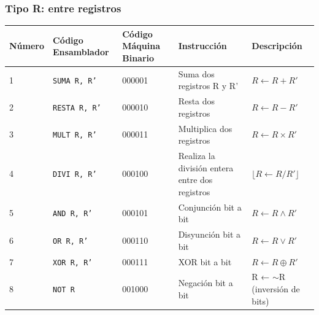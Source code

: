 \documentclass{article}
\begin{document}
\subsubsection{Tipo R: \textbf{entre registros}}

\begin{longtable}{|p{}|p{}|p{}|p{}|p{}|}
  \hline
  \textbf{Número} & \textbf{Código Ensamblador} & \textbf{Código Máquina Binario} & \textbf{Instrucción}                                               & \textbf{Descripción}                       \\
  \hline
  1               & \texttt{SUMA R, R'}         & 000001                          & Suma dos registros R y R'                                          & $R \leftarrow  R + R'$                     \\
  \hline
  2               & \texttt{RESTA R, R'}        & 000010                          & Resta dos registros                                                & $R \leftarrow R - R'$                      \\
  \hline
  3               & \texttt{MULT R, R'}         & 000011                          & Multiplica dos registros                                           & $R \leftarrow R \times R'$                 \\
  \hline
  4               & \texttt{DIVI R, R'}         & 000100                          & Realiza la división entera entre dos registros                     & $\lfloor R \leftarrow R / R' \rfloor$      \\
  \hline
  5               & \texttt{AND R, R'}          & 000101                          & Conjunción bit a bit                                               & $R \leftarrow R \wedge R'$                 \\
  \hline
  6               & \texttt{OR R, R'}           & 000110                          & Disyunción bit a bit                                               & $R \leftarrow R \vee R'$                   \\
  \hline
  7               & \texttt{XOR R, R'}          & 000111                          & XOR bit a bit                                                      & $R \leftarrow R \oplus R'$                 \\
  \hline
  8               & \texttt{NOT R}              & 001000                          & Negación bit a bit                                                 & R ← $\sim$R (inversión de bits)            \\

\end{longtable}
\end{document}
